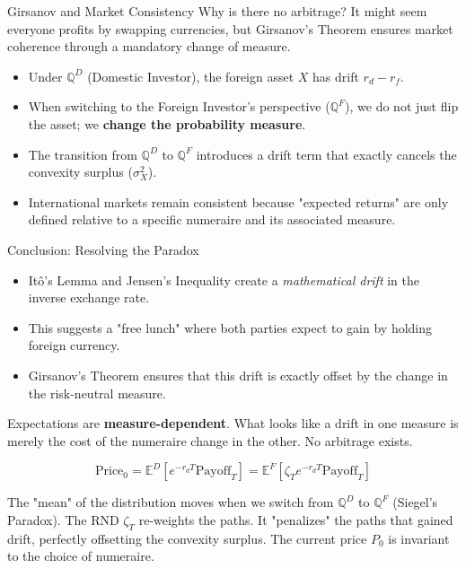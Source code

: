 \documentclass{beamer}
\begin{document}
\begin{frame}{Girsanov and Market Consistency}
	Why is there no arbitrage? It might seem everyone profits by swapping currencies, but Girsanov's Theorem ensures market coherence through a mandatory change of measure.
	
	\begin{itemize}
		\item Under $\mathbb{Q}^D$ (Domestic Investor), the foreign asset $X$ has drift $r_d - r_f$.
		\item When switching to the Foreign Investor's perspective ($\mathbb{Q}^F$), we do not just flip the asset; we \textbf{change the probability measure}.
		\item The transition from $\mathbb{Q}^D$ to $\mathbb{Q}^F$ introduces a drift term that exactly cancels the convexity surplus ($\sigma_X^2$).
		\item International markets remain consistent because "expected returns" are only defined relative to a specific numeraire and its associated measure.
	\end{itemize}
\end{frame}

\begin{frame}{Conclusion: Resolving the Paradox }
	\begin{itemize}
		\item Itô's Lemma and Jensen's Inequality create a \textit{mathematical drift} in the inverse exchange rate.
		\item This suggests a "free lunch" where both parties expect to gain by holding foreign currency.
		\item Girsanov's Theorem ensures that this drift is exactly offset by the change in the risk-neutral measure.
	\end{itemize}
	\vfill
	\begin{tcolorbox}[colback=gray!5, colframe=maincolor, arc=0mm, boxrule=0.5pt]
		\footnotesize
		Expectations are \textbf{measure-dependent}. What looks like a drift in one measure is merely the cost of the numeraire change in the other. No arbitrage exists.
		
		\[ \text{Price}_0 = \mathbb{E}^D \left[ e^{-r_d T} \text{Payoff}_T \right] = \mathbb{E}^F \left[ \zeta_T e^{-r_d T} \text{Payoff}_T \right] \]
		
		The "mean" of the distribution moves when we switch from $\mathbb{Q}^D$ to $\mathbb{Q}^F$ (Siegel's Paradox). The RND $\zeta_T$ re-weights the paths. It "penalizes" the paths that gained drift, perfectly offsetting the convexity surplus. The current price $P_0$ is invariant to the choice of numeraire.
	\end{tcolorbox}
\end{frame}
\end{document}
